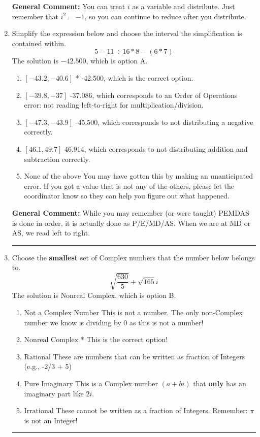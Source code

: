 \documentclass{extbook}[14pt]
\newcommand{\litem}[1]{\item #1

\rule{\textwidth}{0.4pt}}
\begin{document}
\begin{enumerate}
{\textbf{General Comment:} You can treat $i$ as a variable and distribute. Just remember that $i^2=-1$, so you can continue to reduce after you distribute.
}
\litem{
Simplify the expression below and choose the interval the simplification is contained within.
\[ 5 - 11 \div 16 * 8 - (6 * 7) \]
The solution is \( -42.500 \), which is option A.\begin{enumerate}[label=\Alph*.]
\item \( [-43.2, -40.6] \)
* -42.500, which is the correct option.
\item \( [-39.8, -37] \)
 -37.086, which corresponds to an Order of Operations error: not reading left-to-right for multiplication/division.
\item \( [-47.3, -43.9] \)
 -45.500, which corresponds to not distributing a negative correctly.
\item \( [46.1, 49.7] \)
 46.914, which corresponds to not distributing addition and subtraction correctly.
\item \( \text{None of the above} \)
 You may have gotten this by making an unanticipated error. If you got a value that is not any of the others, please let the coordinator know so they can help you figure out what happened.
\end{enumerate}

\textbf{General Comment:} While you may remember (or were taught) PEMDAS is done in order, it is actually done as P/E/MD/AS. When we are at MD or AS, we read left to right.
}
\litem{
Choose the \textbf{smallest} set of Complex numbers that the number below belongs to.
\[ \sqrt{\frac{630}{5}}+\sqrt{165} i \]
The solution is \( \text{Nonreal Complex} \), which is option B.\begin{enumerate}[label=\Alph*.]
\item \( \text{Not a Complex Number} \)
This is not a number. The only non-Complex number we know is dividing by 0 as this is not a number!
\item \( \text{Nonreal Complex} \)
* This is the correct option!
\item \( \text{Rational} \)
These are numbers that can be written as fraction of Integers (e.g., -2/3 + 5)
\item \( \text{Pure Imaginary} \)
This is a Complex number $(a+bi)$ that \textbf{only} has an imaginary part like $2i$.
\item \( \text{Irrational} \)
These cannot be written as a fraction of Integers. Remember: $\pi$ is not an Integer!
\end{enumerate}

}
\end{enumerate}
\end{document}

